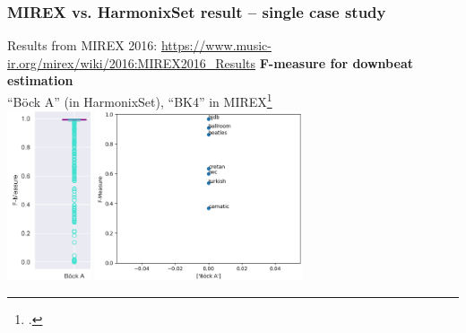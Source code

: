\documentclass{beamer}
\begin{document}
\begin{frame}[fragile]
	\frametitle{MIREX vs. HarmonixSet result -- single case study}
	Results from MIREX 2016: \href{https://www.music-ir.org/mirex/wiki/2016:MIREX2016_Results}{https://www.music-ir.org/mirex/wiki/2016:MIREX2016\_Results}
	\textbf{F-measure for downbeat estimation}\\
	``B{\"o}ck A'' (in HarmonixSet), ``BK4'' in MIREX\footcite{bocka}\\
	\includegraphics[height=5cm]{./bocka_downbeats.png}
	\includegraphics[height=5cm]{./bocka_downbeats_mirex2016.png}
\end{frame}

\end{document}
